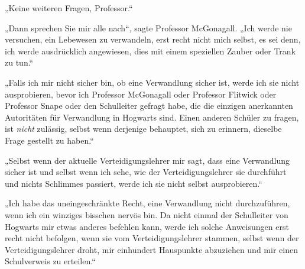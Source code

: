 „Keine weiteren Fragen, Professor.“

„Dann sprechen Sie mir alle nach“, sagte Professor McGonagall.
„Ich werde nie versuchen, ein Lebewesen zu verwandeln, erst recht nicht mich selbst, es sei denn, ich werde ausdrücklich angewiesen, dies mit einem speziellen Zauber oder Trank zu tun.“

„Falls ich mir nicht sicher bin, ob eine Verwandlung sicher ist, werde ich sie nicht ausprobieren, bevor ich Professor McGonagall oder Professor Flitwick oder Professor Snape oder den Schulleiter gefragt habe, die die einzigen anerkannten Autoritäten für Verwandlung in Hogwarts sind. Einen anderen Schüler zu fragen, ist \emph{nicht} zulässig, selbst wenn derjenige behauptet, sich zu erinnern, dieselbe Frage gestellt zu haben.“

„Selbst wenn der aktuelle Verteidigungslehrer mir sagt, dass eine Verwandlung sicher ist und selbst wenn ich sehe, wie der Verteidigungslehrer sie durchführt und nichts Schlimmes passiert, werde ich sie nicht selbst ausprobieren.“

„Ich habe das uneingeschränkte Recht, eine Verwandlung nicht durchzuführen, wenn ich ein winziges bisschen nervös bin. Da nicht einmal der Schulleiter von Hogwarts mir etwas anderes befehlen kann, werde ich solche Anweisungen erst recht nicht befolgen, wenn sie vom Verteidigungslehrer stammen, selbst wenn der Verteidigungslehrer droht, mir einhundert Hauspunkte abzuziehen und mir einen Schulverweis zu erteilen.“

